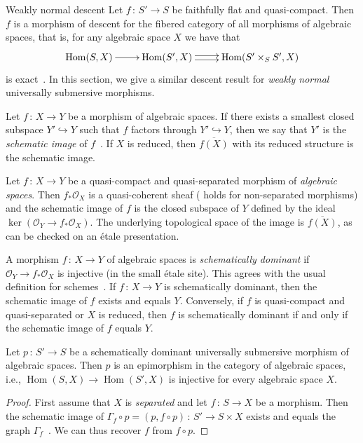 \documentclass[a4paper,twoside,11pt]{amsart}[2009/07/02] %
\DeclareMathOperator{\Hom}{Hom}
\newcommand{\inj}{\hookrightarrow}
\newcommand{\map}[3]{#1\,:\, #2\rightarrow #3}
\newcommand{\etale}{\'{e}tale}
\newcommand\sO{\mathcal{O}} %
\begin{document}
\begin{section}{Weakly normal descent}\label{S:descent-of-morphisms}
Let $\map{f}{S'}{S}$ be faithfully flat and quasi-compact. Then $f$ is a
morphism of descent for the fibered category of all morphisms of algebraic
spaces, that is, for any algebraic space $X$ we have that
%
$$\xymatrix{
\Hom(S,X)\ar[r] & \Hom(S',X)\ar@<.5ex>[r]\ar@<-.5ex>[r]
 & \Hom(S'\times_S S',X)}$$
%
is exact~\cite[Thm.~A.4]{laumon}. In this section, we give a similar descent
result for \emph{weakly normal} universally submersive morphisms.

\begin{xpar}
Let $\map{f}{X}{Y}$ be a morphism of algebraic spaces. If there exists a
smallest closed subspace $Y'\inj Y$ such that $f$ factors through $Y'\inj
Y$, then we say that $Y'$ is the \emph{schematic image} of
$f$~\cite[6.10]{egaI_NE}. If $X$ is reduced, then $\overline{f(X)}$ with its
reduced structure is the schematic image.

Let $\map{f}{X}{Y}$ be a quasi-compact and quasi-separated morphism of
\emph{algebraic spaces}. Then $f_*\sO_X$ is a quasi-coherent sheaf
(\cite[Prop.~II.4.6]{knutson_alg_spaces} holds for non-separated
morphisms) and the schematic image of $f$ is the closed subspace of $Y$
defined by the ideal $\ker(\sO_Y\to f_*\sO_X)$.
The underlying topological space of the image is $\overline{f(X)}$,
as can be checked on an \etale{} presentation.
\end{xpar}

A morphism $\map{f}{X}{Y}$ of algebraic spaces is \emph{schematically dominant}
if $\sO_Y\to f_*\sO_X$ is injective (in the small \etale{} site). This agrees
with the usual definition for schemes~\cite[D\'ef.~11.10.2, Thm.~11.10.5\ 
(ii)]{egaIV}. If $\map{f}{X}{Y}$ is schematically dominant, then the schematic
image of $f$ exists and equals $Y$. Conversely, if $f$ is quasi-compact and
quasi-separated or $X$ is reduced, then $f$ is schematically dominant if and
only if the schematic image of $f$ equals $Y$.

\begin{proposition}\label{P:sch-dom+univ-sub:epimorphism}
Let $\map{p}{S'}{S}$ be a schematically dominant universally submersive
morphism of algebraic spaces. Then $p$ is an epimorphism in the category of
algebraic spaces, i.e., $\Hom(S,X)\to \Hom(S',X)$ is injective for every
algebraic space $X$.
\end{proposition}
\begin{proof}
First assume that $X$ is \emph{separated} and let $\map{f}{S}{X}$ be a
morphism. Then the schematic image of $\map{\Gamma_f\circ p=(p,f\circ
p)}{S'}{S\times X}$ exists and equals the graph
$\Gamma_f$~\cite[Prop.~6.10.3]{egaI_NE}. We can thus recover $f$ from $f\circ
p$.


\end{proof}
\end{section}
\end{document}
